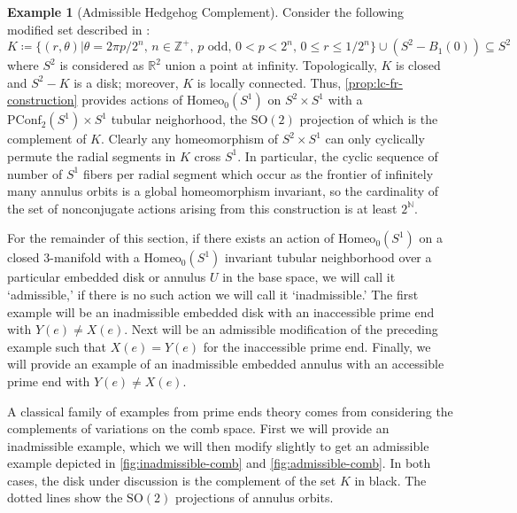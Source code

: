 \documentclass[10pt, oneside]{article}
\newcommand{\R}{\mathbb{R}}
\newcommand{\Z}{\mathbb{Z}}
\newcommand{\N}{\mathbb{N}}
\newcommand{\SO}[1][2]{\text{SO}(#1)}
\newcommand{\homeo}[1][S^1]{\text{Homeo}_0(#1)}
\newcommand{\pconf}[2][S^1]{\text{PConf}_{#2}(#1)}
\theoremstyle{definition}
\newtheorem{eg}{Example}[section]
\theoremstyle{definition}
\begin{document}
\begin{eg}[Admissible Hedgehog Complement]
    Consider the following modified set described in \cite{epstein:PrimeEnds}:
    $$K\coloneqq\{ (r, \theta) \vert \theta = 2\pi p/2^n,\, n\in \Z^+,\, p \text{ odd},\, 0 < p < 2^n,\, 0\leq r\leq 1/2^n\}\cup(S^2-B_1(0))\subseteq S^2$$
    where $S^2$ is considered as $\R^2$ union a point at infinity. Topologically, $K$ is closed and $S^2 - K$ is a disk; moreover, $K$ is locally connected. Thus, \cref{prop:lc-fr-construction} provides actions of $\homeo$ on $S^2\times S^1$ with a $\pconf{2}\times S^1$ tubular neighorhood, the $\SO$ projection of which is the complement of $K$. Clearly any homeomorphism of $S^2\times S^1$ can only cyclically permute the radial segments in $K$ cross $S^1$. In particular, the cyclic sequence of number of $S^1$ fibers per radial segment which occur as the frontier of infinitely many annulus orbits is a global homeomorphism invariant, so the cardinality of the set of nonconjugate actions arising from this construction is at least $2^\N$.
\end{eg}

For the remainder of this section, if there exists an action of $\homeo$ on a closed 3-manifold with a $\homeo$ invariant tubular neighborhood over a particular embedded disk or annulus $U$ in the base space, we will call it `admissible,' if there is no such action we will call it `inadmissible.' The first example will be an inadmissible embedded disk with an inaccessible prime end with $Y(e)\neq X(e)$. Next will be an admissible modification of the preceding example such that $X(e) = Y(e)$ for the inaccessible prime end. Finally, we will provide an example of an inadmissible embedded annulus with an accessible prime end with $Y(e)\neq X(e)$.

A classical family of examples from prime ends theory comes from considering the complements of variations on the comb space. First we will provide an inadmissible example, which we will then modify slightly to get an admissible example depicted in \cref{fig:inadmissible-comb} and \cref{fig:admissible-comb}. In both cases, the disk under discussion is the complement of the set $K$ in black. The dotted lines show the $\SO$ projections of annulus orbits.
\end{document}
